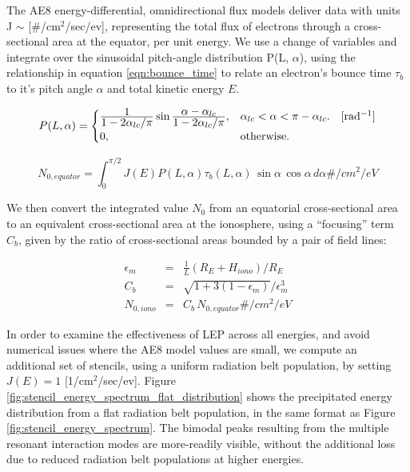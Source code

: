The AE8 energy-differential, omnidirectional flux models deliver data with units J $\sim$ [$\#$/cm$^2$/sec/ev], representing the total flux of electrons through a cross-sectional area at the equator, per unit energy. We use a change of variables and integrate over the sinusoidal pitch-angle distribution P(L, $\alpha$), using the relationship in equation \eqref{eqn:bounce_time} to relate an electron's bounce time $\tau_b$ to it's pitch angle $\alpha$ and total kinetic energy $E$.

\begin{equation}
  P(L,\alpha)=\begin{cases}
    \frac{\displaystyle 1}{\displaystyle 1 - 2\alpha_{lc}/\pi}\sin{\ensuremath{\frac{\displaystyle \alpha - \alpha_{lc}}{\displaystyle 1 - 2\alpha_{lc}/\pi}}}, & \text{$\alpha_{lc} < \alpha < \pi - \alpha_{lc}$}. \quad[\mathrm{rad^{-1}}]\\
    0, & \text{otherwise}.
  \end{cases}
\end{equation}


\begin{equation}
N_{0,equator} = \int_0^{\pi/2} J(E)P(L,\alpha) \tau_b(L, \alpha)\,\sin{\alpha}\,\cos{\alpha}\,d\alpha \unit{\#/cm^2/eV}
\end{equation}

We then convert the integrated value $N_0$ from an equatorial cross-sectional area to an equivalent cross-sectional area at the ionosphere, using a ``focusing'' term $C_b$, given by the ratio of cross-sectional areas bounded by a pair of field lines:

\begin{eqnarray}
\epsilon_m &= & \frac{1}{L}(R_E + H_{iono})/R_E \\
C_b & = & \sqrt{1 + 3(1 - \epsilon_m)} / \epsilon_m^3 \\ 
N_{0, iono} &=& C_b\,N_{0, equator} \unit{\#/cm^2/eV}
\label{eqn:fieldline_density}
\end{eqnarray}

In order to examine the effectiveness of LEP across all energies, and avoid numerical issues where the AE8 model values are small, we compute an additional set of stencils, using a uniform radiation belt population, by setting $J(E) = 1$ [1/cm$^2$/sec/ev].  Figure \ref{fig:stencil_energy_spectrum_flat_distribution} shows the precipitated energy distribution from a flat radiation belt population, in the same format as Figure \ref{fig:stencil_energy_spectrum}. The bimodal peaks resulting from the multiple resonant interaction modes are more-readily visible, without the additional loss due to reduced radiation belt populations at higher energies.

